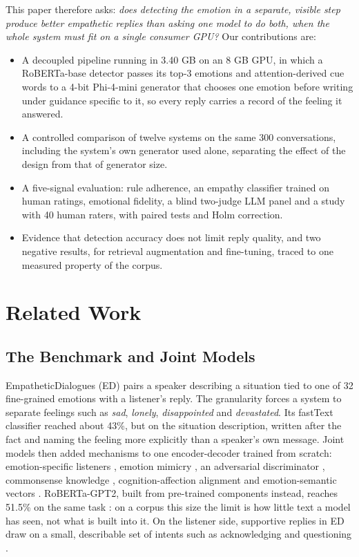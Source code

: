 This paper therefore asks: \textit{does detecting the emotion in a separate, visible step produce better empathetic replies than asking one model to do both, when the whole system must fit on a single consumer GPU?} Our contributions are:
\begin{itemize}
\item A decoupled pipeline running in 3.40 GB on an 8 GB GPU, in which a RoBERTa-base detector passes its top-3 emotions and attention-derived cue words to a 4-bit Phi-4-mini generator that chooses one emotion before writing under guidance specific to it, so every reply carries a record of the feeling it answered.
\item A controlled comparison of twelve systems on the same 300 conversations, including the system's own generator used alone, separating the effect of the design from that of generator size.
\item A five-signal evaluation: rule adherence, an empathy classifier trained on human ratings, emotional fidelity, a blind two-judge LLM panel and a study with 40 human raters, with paired tests and Holm correction.
\item Evidence that detection accuracy does not limit reply quality, and two negative results, for retrieval augmentation and fine-tuning, traced to one measured property of the corpus.
\end{itemize}

\section{Related Work}\label{sec:related}

\subsection{The Benchmark and Joint Models}
EmpatheticDialogues (ED) \cite{rashkin2019, ed_github} pairs a speaker describing a situation tied to one of 32 fine-grained emotions with a listener's reply. The granularity forces a system to separate feelings such as \textit{sad}, \textit{lonely}, \textit{disappointed} and \textit{devastated}. Its fastText classifier reached about 43\%, but on the situation description, written after the fact and naming the feeling more explicitly than a speaker's own message. Joint models then added mechanisms to one encoder-decoder trained from scratch: emotion-specific listeners \cite{lin2019moel}, emotion mimicry \cite{majumder2020mime}, an adversarial discriminator \cite{li2020empdg}, commonsense knowledge \cite{li2022kemp, sabour2022cem}, cognition-affection alignment \cite{zhou2023case} and emotion-semantic vectors \cite{yang2023escm}. RoBERTa-GPT2, built from pre-trained components instead, reaches 51.5\% on the same task \cite{liu2021robertagpt2}: on a corpus this size the limit is how little text a model has seen, not what is built into it. On the listener side, supportive replies in ED draw on a small, describable set of intents such as acknowledging and questioning \cite{welivita2020}.

